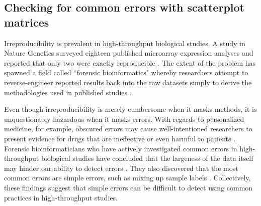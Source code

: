 \documentclass{bmcart}
\begin{document}
\begin{linenumbers}
\begin{doublespacing}
\subsection*{Checking for common errors with scatterplot matrices}

Irreproducibility is prevalent in high-throughput biological studies. A study in Nature Genetics surveyed eighteen published microarray expression analyses and reported that only two were exactly reproducible \cite{Ioannidis}. The extent of the problem has spawned a field called ``forensic bioinformatics" whereby researchers attempt to reverse-engineer reported results back into the raw datasets simply to derive the methodologies used in published studies \cite{Baggerly}.

Even though irreproducibility is merely cumbersome when it masks methods, it is unquestionably hazardous when it masks errors. With regards to personalized medicine, for example, obscured errors may cause well-intentioned researchers to present evidence for drugs that are ineffective or even harmful to patients \cite{Baggerly}. Forensic bioinformaticians who have actively investigated common errors in high-throughput biological studies have concluded that the largeness of the data itself may hinder our ability to detect errors \cite{Baggerly}. They also discovered that the most common errors are simple errors, such as mixing up sample labels \cite{Baggerly}. Collectively, these findings suggest that simple errors can be difficult to detect using common practices in high-throughput studies.


\end{doublespacing}
\end{linenumbers}
\end{document}
